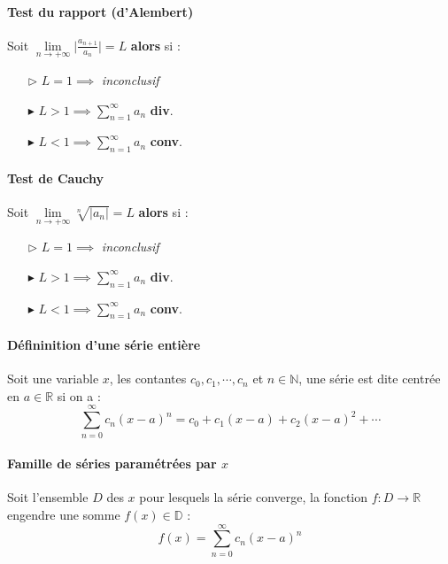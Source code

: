 \documentclass{report}
\begin{document}
\begin{multicols*}{3}
  \paragraph{Test du rapport (d'Alembert)}
  \mbox{}\vspace{0.2em}
  Soit $\lim\limits_{n \to+\infty } \Big|\frac{a_{n+1}}{a_n}  \Big| = L$ 
  \textbf{alors} si :   
  \begin{itemize}
    \item [$\rhd$ ] $L = 1 \implies$ \textit{ inconclusif}  
    \item [$\blacktriangleright$ ] $L > 1 \implies \sum_{n=1}^{\infty } a_n$ 
      \textbf{div}.   
    \item [$\blacktriangleright$ ] $L < 1 \implies \sum_{n=1}^{\infty } a_n$ \textbf{conv}.   
  \end{itemize}



  \paragraph{Test de Cauchy}
  \mbox{}\vspace{0.2em}
  Soit $\lim\limits_{n \to+\infty } \sqrt[n]{\big| a_n \big|} = L$ 
  \textbf{alors} si :   
  \begin{itemize}
    \item [$\rhd$ ] $L = 1 \implies$ \textit{inconclusif}  
    \item [$\blacktriangleright$ ] $L > 1 \implies \sum_{n=1}^{\infty }a_n$ 
      \textbf{div}.   
    \item [$\blacktriangleright$ ] $L < 1 \implies \sum_{n=1}^{\infty }a_n$ 
      \textbf{conv}.
  \end{itemize}

  \paragraph{Défininition d'une série entière} Soit une variable 
  $x$, les contantes $c_0, c_1, \cdots , c_n$ 
  et $n \in \mathbb{N}$, une série 
  est dite centrée en $a \in \mathbb{R}$ si on a :  
  \[ \sum_{n=0}^{\infty } c_n(x-a)^n = c_0 + c_1(x-a) + c_2(x-a)^2 + \cdots \]

  \paragraph{Famille de séries paramétrées par $x$} 
  Soit l'ensemble $D$ des $x$ pour lesquels la série converge, 
  la fonction $f : D \rightarrow  \mathbb{R}$ engendre une 
  somme $f(x) \in \mathbb{D}$ :
  \[ f(x) = \sum_{n=0}^{\infty } c_n(x - a)^n \]
  \vspace{-1.5em} %


\end{multicols*}
\end{document}
